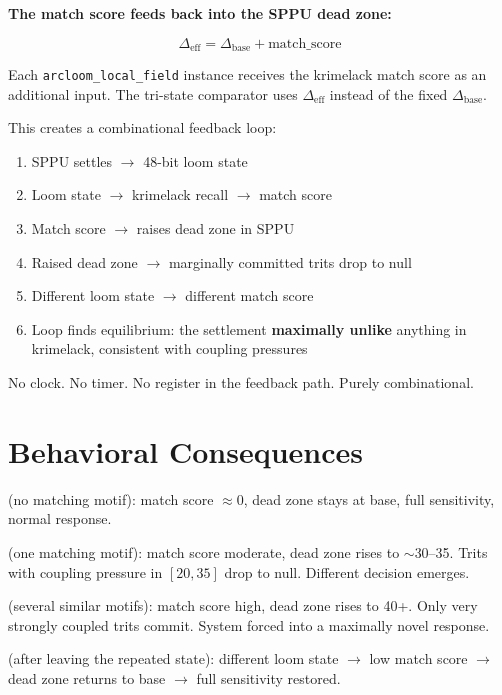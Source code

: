 \documentclass[11pt, a4paper]{report}
\begin{document}
\textbf{The match score feeds back into the SPPU dead zone:}

\begin{equation}
  \Delta_{\text{eff}} = \Delta_{\text{base}} + \text{match\_score}
\end{equation}

Each \texttt{arcloom\_local\_field} instance receives the krimelack match score
as an additional input. The tri-state comparator uses $\Delta_{\text{eff}}$
instead of the fixed $\Delta_{\text{base}}$.

This creates a combinational feedback loop:

\begin{enumerate}[nosep]
  \item SPPU settles $\rightarrow$ 48-bit loom state
  \item Loom state $\rightarrow$ krimelack recall $\rightarrow$ match score
  \item Match score $\rightarrow$ raises dead zone in SPPU
  \item Raised dead zone $\rightarrow$ marginally committed trits drop to null
  \item Different loom state $\rightarrow$ different match score
  \item Loop finds equilibrium: the settlement \textbf{maximally unlike}
        anything in krimelack, consistent with coupling pressures
\end{enumerate}

No clock. No timer. No register in the feedback path. Purely combinational.

\section{Behavioral Consequences}

\begin{description}[nosep]
  \item[Novel input] (no matching motif): match score $\approx 0$, dead zone
    stays at base, full sensitivity, normal response.
  \item[First repetition] (one matching motif): match score moderate, dead zone
    rises to $\sim$30--35. Trits with coupling pressure in $[20, 35]$ drop to
    null. Different decision emerges.
  \item[Multiple similar experiences] (several similar motifs): match score high,
    dead zone rises to 40+. Only very strongly coupled trits commit. System
    forced into a maximally novel response.
  \item[New situation] (after leaving the repeated state): different loom state
    $\rightarrow$ low match score $\rightarrow$ dead zone returns to base
    $\rightarrow$ full sensitivity restored.
\end{description}
\end{document}
